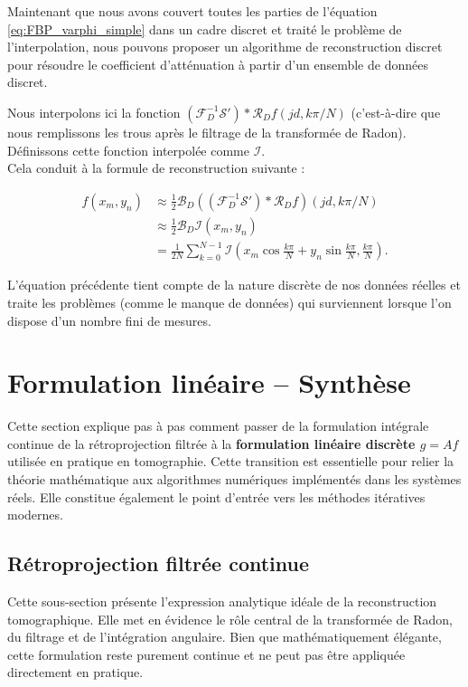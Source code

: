 Maintenant que nous avons couvert toutes les parties de l'équation \eqref{eq:FBP_varphi_simple} dans un cadre discret et traité le problème de l'interpolation, nous pouvons proposer un algorithme de reconstruction discret pour résoudre le coefficient d'atténuation à partir d'un ensemble de données discret.  

Nous interpolons ici la fonction $\left(\mathcal{F}_D^{-1}\mathcal{S}'\right) \ast \mathcal{R}_D f(jd,k\pi/N)$ (c'est-à-dire que nous remplissons les trous après le filtrage de la transformée de Radon). \\Définissons cette fonction interpolée comme $\mathcal{I}$. \\Cela conduit à la formule de reconstruction suivante :

\begin{equation}
\begin{aligned}
f(x_m,y_n) &\approx \frac{1}{2} \mathcal{B}_D \left( \left( \mathcal{F}_D^{-1}\mathcal{S}' \right) \ast \mathcal{R}_D f \right) (jd, k\pi/N) \\
&\approx \frac{1}{2} \mathcal{B}_D \mathcal{I}(x_m,y_n) \\
&= \frac{1}{2N} \sum_{k=0}^{N-1} \mathcal{I} \left( x_m \cos \frac{k\pi}{N} + y_n \sin \frac{k\pi}{N}, \frac{k\pi}{N} \right).
\end{aligned}
\end{equation}

L'équation précédente tient compte de la nature discrète de nos données réelles et traite les problèmes (comme le manque de données) qui surviennent lorsque l'on dispose d'un nombre fini de mesures.

\section{Formulation linéaire -- Synthèse}

Cette section explique pas à pas comment passer de la formulation intégrale continue de la rétroprojection filtrée à la \textbf{formulation linéaire discrète \( g = Af \)} utilisée en pratique en tomographie. Cette transition est essentielle pour relier la théorie mathématique aux algorithmes numériques implémentés dans les systèmes réels. Elle constitue également le point d'entrée vers les méthodes itératives modernes.

\subsection{Rétroprojection filtrée continue}
Cette sous-section présente l'expression analytique idéale de la reconstruction tomographique. Elle met en évidence le rôle central de la transformée de Radon, du filtrage et de l'intégration angulaire. Bien que mathématiquement élégante, cette formulation reste purement continue et ne peut pas être appliquée directement en pratique.

